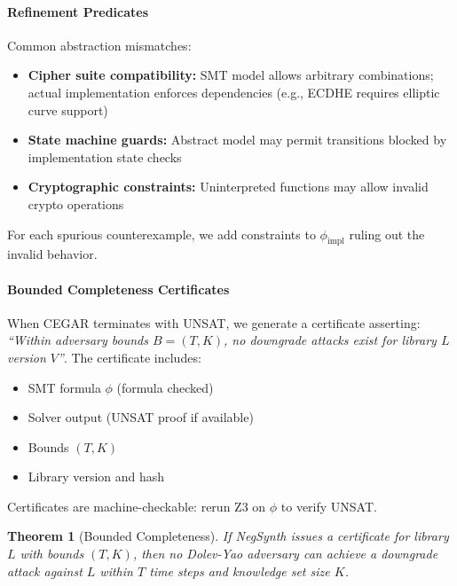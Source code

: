 \documentclass[10pt,twocolumn]{article}
\newtheorem{theorem}{Theorem}
\begin{document}
\paragraph{Refinement Predicates}
Common abstraction mismatches:
\begin{itemize}[leftmargin=*,noitemsep]
\item \textbf{Cipher suite compatibility:} SMT model allows arbitrary combinations; actual implementation enforces dependencies (e.g., ECDHE requires elliptic curve support)
\item \textbf{State machine guards:} Abstract model may permit transitions blocked by implementation state checks
\item \textbf{Cryptographic constraints:} Uninterpreted functions may allow invalid crypto operations
\end{itemize}

For each spurious counterexample, we add constraints to $\phi_{\text{impl}}$ ruling out the invalid behavior.

\paragraph{Bounded Completeness Certificates}
When CEGAR terminates with UNSAT, we generate a certificate asserting: \emph{``Within adversary bounds $B = (T, K)$, no downgrade attacks exist for library $L$ version $V$''}. The certificate includes:
\begin{itemize}[leftmargin=*,noitemsep]
\item SMT formula $\phi$ (formula checked)
\item Solver output (UNSAT proof if available)
\item Bounds $(T, K)$
\item Library version and hash
\end{itemize}

Certificates are machine-checkable: rerun Z3 on $\phi$ to verify UNSAT.

\begin{theorem}[Bounded Completeness]
\label{thm:completeness}
If NegSynth issues a certificate for library $L$ with bounds $(T, K)$, then no Dolev-Yao adversary can achieve a downgrade attack against $L$ within $T$ time steps and knowledge set size $K$.
\end{theorem}
\end{document}
